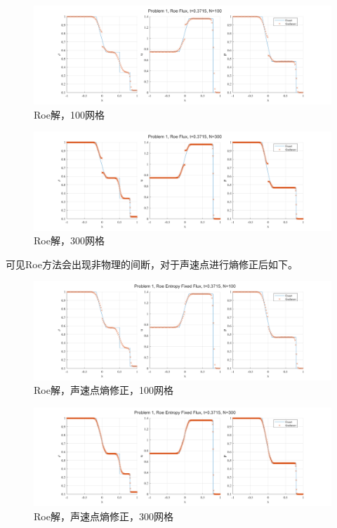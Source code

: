 \documentclass[UTF8,zihao=5]{ctexart} %
\begin{document}
\begin{figure}[H]
    \centering
    \includegraphics[width=18cm]{p1_Roe_N100.png}  %
    \caption{Roe解，100网格}
\end{figure}

\begin{figure}[H]
    \centering
    \includegraphics[width=18cm]{p1_Roe_N300.png}  %
    \caption{Roe解，300网格}
\end{figure}

可见Roe方法会出现非物理的间断，对于声速点进行熵修正后如下。

\begin{figure}[H]
    \centering
    \includegraphics[width=18cm]{p1_Roe Entropy Fixed_N100.png}  %
    \caption{Roe解，声速点熵修正，100网格}
\end{figure}

\begin{figure}[H]
    \centering
    \includegraphics[width=18cm]{p1_Roe Entropy Fixed_N300.png}  %
    \caption{Roe解，声速点熵修正，300网格}
\end{figure}
\end{document}
